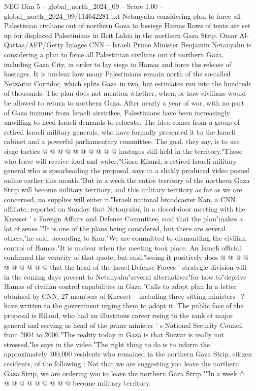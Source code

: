 \begin{textsample}{NEG Dim 5 – global\_north\_2024\_09 – Score 1.00 – global\_north\_2024\_09/114642281.txt}  \label{ex:f5_neg_096}
Netanyahu considering plan to force all Palestinian civilians out of northern Gaza to besiege Hamas Rows of tents are set up for displaced Palestinians in Beit Lahia in the northern Gaza Strip.
Omar Al-Qattaa/AFP/Getty Images CNN -- Israeli Prime Minister Benjamin Netanyahu is considering a plan to force all Palestinian civilians out of northern Gaza, including Gaza City, in order to lay siege to Hamas and force the release of hostages.
It is unclear how many Palestinians remain north of the so-called Netzarim Corridor, which splits Gaza in two, but estimates run into the hundreds of thousands.
The plan does not mention whether, when, or how civilians would be allowed to return to northern Gaza.
After nearly a year of war, with no part of Gaza immune from Israeli airstrikes, Palestinians have been increasingly unwilling to heed Israeli demands to relocate.
The idea comes from a group of retired Israeli military generals, who have formally presented it to the Israeli cabinet and a powerful parliamentary committee.
The goal, they say, is to use siege tactics @ @ @ @ @ @ @ @ @ @ hostages still held in the territory."Those who leave will receive food and water,"Giora Eiland, a retired Israeli military general who is spearheading the proposal, says in a slickly produced video posted online earlier this month."But in a week the entire territory of the northern Gaza Strip will become military territory, and this military territory as far as we are concerned, no supplies will enter it."Israeli national broadcaster Kan, a CNN affiliate, reported on Sunday that Netanyahu, in a closed-door meeting with the Knesset ' s Foreign Affairs and Defense Committee, said that the plan"makes a lot of sense.""It is one of the plans being considered, but there are several others,"he said, according to Kan."We are committed to dismantling the civilian control of Hamas."It is unclear when the meeting took place.
An Israeli official confirmed the veracity of that quote, but said,"seeing it positively does @ @ @ @ @ @ @ @ @ @ that the head of the Israel Defense Forces ' strategic division will in the coming days present to Netanyahu"several alternatives"for how to"deprive Hamas of civilian control capabilities in Gaza."Calls to adopt plan In a letter obtained by CNN, 27 members of Knesset -- including three sitting ministers --? have written to the government urging them to adopt it.
The public face of the proposal is Eiland, who had an illustrious career rising to the rank of major general and serving as head of the prime minister ' s National Security Council from 2004 to 2006."The reality today in Gaza is that Sinwar is really not stressed,"he says in the video."The right thing to do is to inform the approximately 300,000 residents who remained in the northern Gaza Strip, citizen residents, of the following : Not that we are suggesting you leave the northern Gaza Strip, we are ordering you to leave the northern Gaza Strip.""In a week @ @ @ @ @ @ @ @ @ @ become military territory.

\end{textsample}
